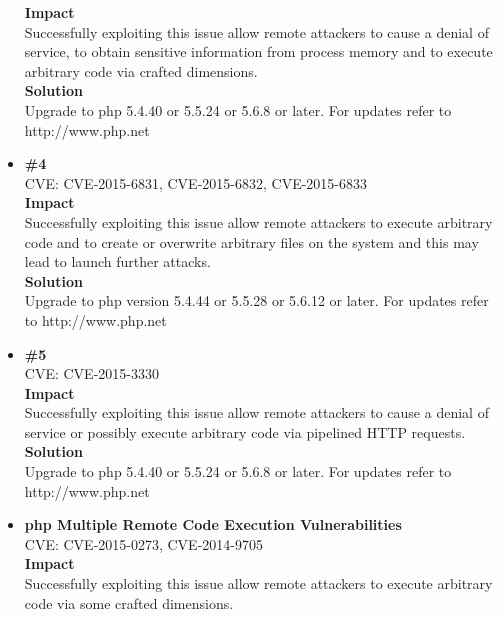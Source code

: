 \begin{itemize}
\textbf{Impact} \\
Successfully exploiting this issue allow remote attackers to cause a denial of service, to obtain sensitive information from process memory and to execute arbitrary code via crafted dimensions.\\


\textbf{Solution}\\
Upgrade to php 5.4.40 or 5.5.24 or 5.6.8 or later. For updates refer to http://www.php.net\\


\item \textbf{\#4} \\
CVE:	CVE-2015-6831, CVE-2015-6832, CVE-2015-6833\\

\textbf{Impact} \\
Successfully exploiting this issue allow remote attackers to execute arbitrary code and to create or overwrite arbitrary files on the system and this may lead to launch further attacks.\\

\textbf{Solution}\\
Upgrade to php version 5.4.44 or 5.5.28 or 5.6.12 or later. For updates refer to http://www.php.net\\

\item \textbf{\#5} \\
CVE: CVE-2015-3330\\

\textbf{Impact} \\
Successfully exploiting this issue allow remote attackers to cause a denial of service or possibly execute arbitrary code via pipelined HTTP requests.\\


\textbf{Solution}\\
Upgrade to php 5.4.40 or 5.5.24 or 5.6.8 or later. For updates refer to http://www.php.net\\

\item \textbf{php Multiple Remote Code Execution Vulnerabilities} \\
CVE: CVE-2015-0273, CVE-2014-9705 \\

\textbf{Impact} \\
Successfully exploiting this issue allow remote attackers to execute arbitrary code via some crafted dimensions.\\


\end{itemize}
